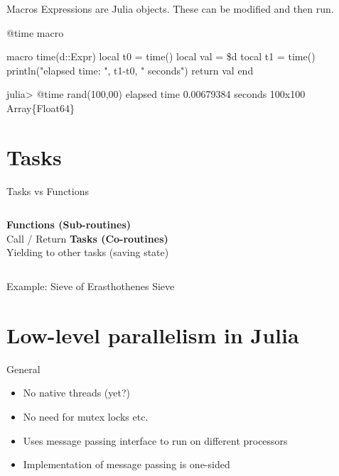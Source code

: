 \documentclass{beamer}
\begin{document}
	\begin{frame}[fragile]{Macros}
		Expressions are Julia objects. These can be modified and then run.
		\begin{block}{@time macro}
			\begin{semiverbatim}
			macro time(d::Expr) 
			  local t0 = time()
			  local val = \$d
			  tocal t1 = time()
			  println("elapsed time: ", t1-t0, " seconds")
			  return val
			end

			julia> @time rand(100,00)
			elapsed time 0.00679384 seconds
			100x100 Array\{Float64\}
			\end{semiverbatim}
		\end{block}
	\end{frame}

	\section{Tasks}

	\begin{frame}{Tasks vs Functions}
		\begin{columns}[c]
				\textbf{Functions (Sub-routines)} \\
				Call / Return
				\textbf{Tasks (Co-routines)} \\
				Yielding to other tasks (saving state)
		\end{columns}
	\end{frame}

	\begin{frame}{Example: Sieve of Erasthothenes}
		Sieve
	\end{frame}

	\section{Low-level parallelism in Julia}

	\begin{frame}{General}
		\begin{itemize}
			\item{No native threads (yet?)}
			\item{No need for mutex locks etc.}	
			\item{Uses message passing interface to run on different processors}
			\item{Implementation of message passing is one-sided}
		\end{itemize}

	\end{frame}
	
\end{document}
